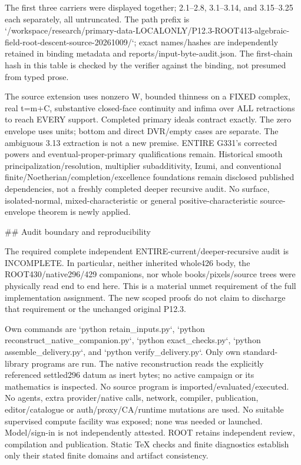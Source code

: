 \documentclass[11pt]{article}
\begin{document}
The first three carriers were displayed together; 2.1--2.8, 3.1--3.14, and 3.15--3.25 each separately, all untruncated. The path prefix is `/workspace/research/primary-data-LOCALONLY/P12.3-ROOT413-algebraic-field-root-descent-source-20261009/`; exact names/hashes are independently retained in binding metadata and reports/input-byte-audit.json. The first-chain hash in this table is checked by the verifier against the binding, not presumed from typed prose.

The source extension uses nonzero W, bounded thinness on a FIXED complex, real t=m+C, substantive closed-face continuity and infima over ALL retractions to reach EVERY support. Completed primary ideals contract exactly. The zero envelope uses units; bottom and direct DVR/empty cases are separate. The ambiguous 3.13 extraction is not a new premise. ENTIRE G331's corrected powers and eventual-proper-primary qualifications remain. Historical smooth principalization/resolution, multiplier subadditivity, Izumi, and conventional finite/Noetherian/completion/excellence foundations remain disclosed published dependencies, not a freshly completed deeper recursive audit. No surface, isolated-normal, mixed-characteristic or general positive-characteristic source-envelope theorem is newly applied.

\#\# Audit boundary and reproducibility

The required complete independent ENTIRE-current/deeper-recursive audit is INCOMPLETE. In particular, neither inherited whole426 body, the ROOT430/native296/429 companions, nor whole books/pixels/source trees were physically read end to end here. This is a material unmet requirement of the full implementation assignment. The new scoped proofs do not claim to discharge that requirement or the unchanged original P12.3.

Own commands are `python retain\_inputs.py`, `python reconstruct\_native\_companion.py`, `python exact\_checks.py`, `python assemble\_delivery.py`, and `python verify\_delivery.py`. Only own standard-library programs are run. The native reconstruction reads the explicitly referenced settled296 datum as inert bytes; no active campaign or its mathematics is inspected. No source program is imported/evaluated/executed. No agents, extra provider/native calls, network, compiler, publication, editor/catalogue or auth/proxy/CA/runtime mutations are used. No suitable supervised compute facility was exposed; none was needed or launched. Model/sign-in is not independently attested. ROOT retains independent review, compilation and publication. Static TeX checks and finite diagnostics establish only their stated finite domains and artifact consistency.
\end{document}
